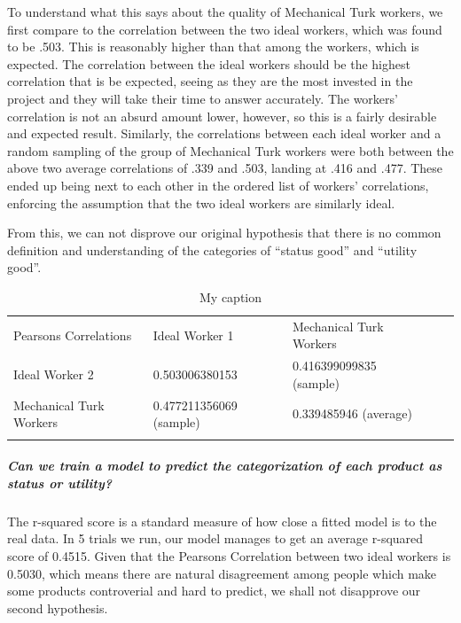 \documentclass[dvips,12pt]{article}
\begin{document}
To understand what this says about the quality of Mechanical Turk workers, we first compare to the correlation between the two ideal workers, which was found to be .503. This is reasonably higher than that among the workers, which is expected. The correlation between the ideal workers should be the highest correlation that is be expected, seeing as they are the most invested in the project and they will take their time to answer accurately. The workers’ correlation is not an absurd amount lower, however, so this is a fairly desirable and expected result. Similarly, the correlations between each ideal worker and a random sampling of the group of Mechanical Turk workers were both between the above two average correlations of .339 and .503, landing at .416 and .477. These ended up being next to each other in the ordered list of workers’ correlations, enforcing the assumption that the two ideal workers are similarly ideal. 

From this, we can not disprove our original hypothesis that there is no common definition and understanding of the categories of “status good” and “utility good”.

\begin{table}[]
	\centering
	\caption{My caption}
	\label{my-label}
	\begin{tabular}{lllll}
		\cline{1-3}
		\multicolumn{1}{|l|}{Pearsons Correlations}   & \multicolumn{1}{l|}{Ideal Worker 1}          & \multicolumn{1}{l|}{Mechanical Turk Workers} &  &  \\ \cline{1-3}
		\multicolumn{1}{|l|}{Ideal Worker 2}          & \multicolumn{1}{l|}{0.503006380153}          & \multicolumn{1}{l|}{0.416399099835 (sample)} &  &  \\ \cline{1-3}
		\multicolumn{1}{|l|}{Mechanical Turk Workers} & \multicolumn{1}{l|}{0.477211356069 (sample)} & \multicolumn{1}{l|}{0.339485946 (average)}   &  &  \\ \cline{1-3}
		&                                              &                                              &  & 
	\end{tabular}
\end{table}

\subparagraph{Can we train a model to predict the categorization of each product as status or utility? }

The r-squared score is a standard measure of how close a fitted model is to the real data. In 5 trials we run, our model manages to get an average r-squared score of 0.4515. Given that the Pearsons Correlation between two ideal workers is 0.5030, which means there are natural disagreement among people which make some products controverial and hard to predict, we shall not disapprove our second hypothesis.
\end{document}
